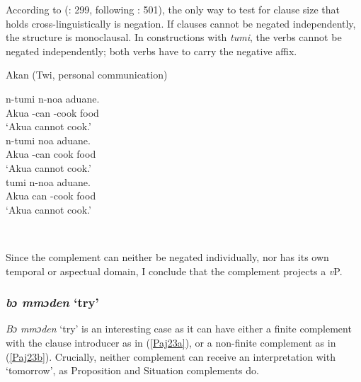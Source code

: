 \documentclass[output=paper]{langscibook}
\begin{document}
According to \citeauthor{haspelmath2016} (\citeyear{haspelmath2016}: 299, following \citealt{bohnemeyernodate}: 501), the only way to test for clause size that holds cross-linguistically is negation. If clauses cannot be negated independently, the structure is monoclausal. In constructions with \emph{tumi}, the verbs cannot be negated independently; both verbs have to carry the negative affix. 

\begin{exe}
\ex \label{Paj20} Akan (Twi, personal communication)
\begin{xlist}

\ex \label{Paj20a} 
 {n-tumi} {n-noa} {aduane}.\\
  Akua -can -cook food\\
\glt `Akua cannot cook.'\\

\ex \label{Paj20b} 
 {n-tumi} {noa} {aduane}.\\
  Akua -can cook food\\
\glt `Akua cannot cook.'\\

\ex \label{Paj20c} 
 {tumi} {n-noa} {aduane}.\\
  Akua can -cook food\\
\glt `Akua cannot cook.'\\

\end{xlist}
\end{exe}
 \

Since the complement can neither be negated individually, nor has its own temporal or aspectual domain, I conclude that the complement projects a \emph{v}P. 

\subsubsection{\textit{b{ɔ} mm{ɔ}den} `try'}

\emph{Bɔ mmɔden} ‘try’ is an interesting case as it can have either a finite complement with the clause introducer as in (\ref{Paj23a}), or a non-finite complement as in (\ref{Paj23b}). Crucially, neither complement can receive an interpretation with ‘tomorrow’, as Proposition and Situation complements do.
\end{document}
